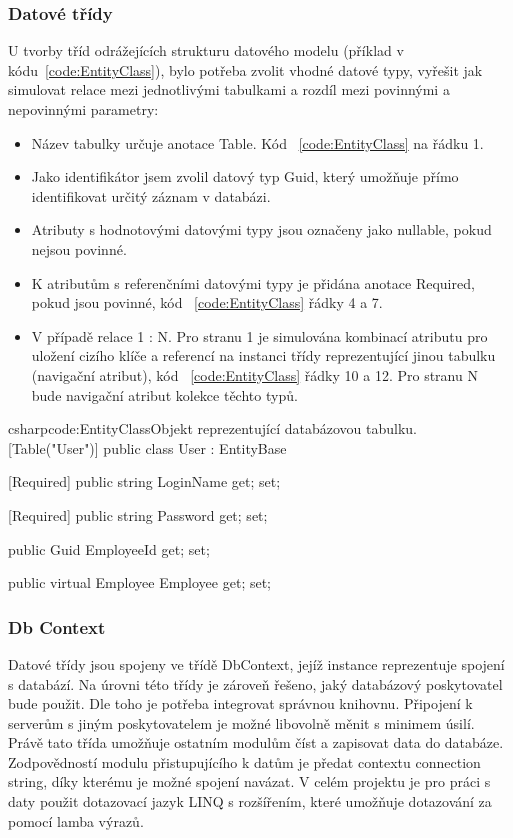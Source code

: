 \documentclass[
  glossaries,
]{kidiplom}
\begin{document}
\subsubsection{Datové třídy}
 U tvorby tříd odrážejících strukturu datového modelu (příklad v kódu~\ref{code:EntityClass}), bylo potřeba zvolit vhodné datové typy, vyřešit jak simulovat relace mezi jednotlivými tabulkami a rozdíl mezi povinnými a nepovinnými parametry:
\begin{itemize}
	\item Název tabulky určuje anotace Table. Kód ~\ref{code:EntityClass} na řádku 1. 
	\item Jako identifikátor jsem zvolil datový typ Guid, který umožňuje přímo identifikovat určitý záznam v databázi.
	\item Atributy s hodnotovými datovými typy jsou označeny jako nullable, pokud nejsou povinné.
	\item K atributům s referenčními datovými typy je přidána anotace Required, pokud jsou povinné, kód ~\ref{code:EntityClass} řádky 4 a 7.
	\item V případě relace 1 : N. Pro stranu 1 je simulována kombinací atributu pro uložení cizího klíče a referencí na instanci třídy reprezentující jinou tabulku (navigační atribut), kód ~\ref{code:EntityClass} řádky 10 a 12. Pro stranu N bude navigační atribut kolekce těchto typů.
\end{itemize}

\begin{kicode}{csharp}{code:EntityClass}{Objekt reprezentující databázovou tabulku.}
[Table("User")]
    public class User : EntityBase
    {
        [Required]
        public string LoginName { get; set; }

        [Required]
        public string Password { get; set; }

        public Guid EmployeeId { get; set; }

        public virtual Employee Employee { get; set; }
    }
\end{kicode}

\subsubsection{Db Context}
Datové třídy jsou spojeny ve třídě DbContext, jejíž instance reprezentuje spojení s databází. Na úrovni této třídy je zároveň řešeno, jaký databázový poskytovatel bude použit. Dle toho je potřeba integrovat správnou knihovnu. Připojení k serverům s jiným poskytovatelem je možné libovolně měnit s minimem úsilí. Právě tato třída umožňuje ostatním modulům číst a zapisovat data do databáze. Zodpovědností modulu přistupujícího k datům je předat contextu connection string, díky kterému je možné spojení navázat. V celém projektu je pro práci s daty použit dotazovací jazyk LINQ s rozšířením, které umožňuje dotazování za pomocí lamba výrazů.
\end{document}
